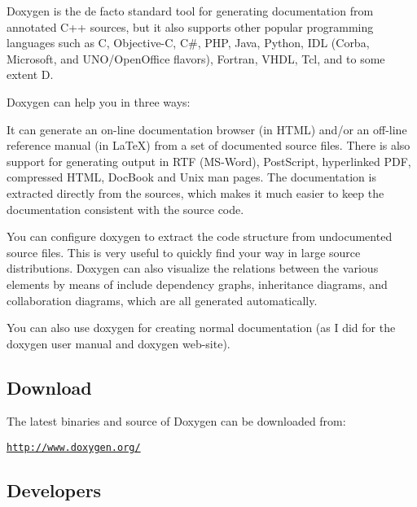 \href{https://www.paypal.com/cgi-bin/webscr?cmd=_s-xclick&hosted_button_id=9HHLRBCC8B2B8}{\tt }

Doxygen is the de facto standard tool for generating documentation from annotated C++ sources, but it also supports other popular programming languages such as C, Objective-\/C, C\#, P\+HP, Java, Python, I\+DL (Corba, Microsoft, and U\+N\+O/\+Open\+Office flavors), Fortran, V\+H\+DL, Tcl, and to some extent D.

Doxygen can help you in three ways\+:


\begin{DoxyEnumerate}
\item It can generate an on-\/line documentation browser (in H\+T\+ML) and/or an off-\/line reference manual (in La\+TeX) from a set of documented source files. There is also support for generating output in R\+TF (M\+S-\/\+Word), Post\+Script, hyperlinked P\+DF, compressed H\+T\+ML, Doc\+Book and Unix man pages. The documentation is extracted directly from the sources, which makes it much easier to keep the documentation consistent with the source code.
\item You can configure doxygen to extract the code structure from undocumented source files. This is very useful to quickly find your way in large source distributions. Doxygen can also visualize the relations between the various elements by means of include dependency graphs, inheritance diagrams, and collaboration diagrams, which are all generated automatically.
\item You can also use doxygen for creating normal documentation (as I did for the doxygen user manual and doxygen web-\/site).
\end{DoxyEnumerate}

\subsection*{Download }

The latest binaries and source of Doxygen can be downloaded from\+:
\begin{DoxyItemize}
\item \href{http://www.doxygen.org/}{\tt http\+://www.\+doxygen.\+org/}
\end{DoxyItemize}

\subsection*{Developers }


